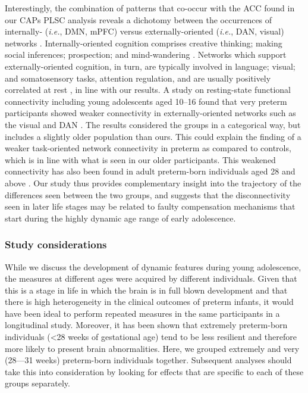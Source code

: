 Interestingly, the combination of patterns that co-occur with the ACC found in our CAPs PLSC analysis reveals a dichotomy between the occurrences of internally- (\textit{i.e.}, DMN, mPFC) versus externally-oriented (\textit{i.e.}, DAN, visual) networks \citep{Zabelina2016}. Internally-oriented cognition comprises creative thinking; making social inferences; prospection; and mind-wandering \citep{Zabelina2016, Buckner2019}. Networks which support externally-oriented cognition, in turn, are typically involved in language; visual; and somatosensory tasks, attention regulation, and are usually positively correlated at rest \citep{Lee2012}, in line with our results. A study on resting-state functional connectivity including young adolescents aged 10--16 found that very preterm participants showed weaker connectivity in externally-oriented networks such as the visual and DAN \citep{Wehrle2018}. The results considered the groups in a categorical way, but includes a slightly older population than ours. This could explain the finding of a weaker task-oriented network connectivity in preterm as compared to controls, which is in line with what is seen in our older participants. This weakened connectivity has also been found in adult preterm-born individuals aged 28 and above \citep{White2014}. Our study thus provides complementary insight into the trajectory of the differences seen between the two groups, and suggests that the disconnectivity seen in later life stages may be related to faulty compensation mechanisms that start during the highly dynamic age range of early adolescence.

\subsubsection*{Study considerations}
While we discuss the development of dynamic features during young adolescence, the measures at different ages were acquired by different individuals. Given that this is a stage in life in which the brain is in full blown development and that there is high heterogeneity in the clinical outcomes of preterm infants, it would have been ideal to perform repeated measures in the same participants in a longitudinal study. Moreover, it has been shown that extremely preterm-born individuals (<28 weeks of gestational age) tend to be less resilient and therefore more likely to present brain abnormalities. Here, we grouped extremely and very (28---31 weeks) preterm-born individuals together. Subsequent analyses should take this into consideration by looking for effects that are specific to each of these groups separately.

